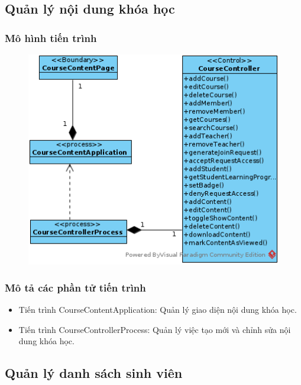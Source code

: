 \documentclass[./../main.tex]{subfiles}
\begin{document}
\subsection{Quản lý nội dung khóa học}

\subsubsection{Mô hình tiến trình}

\begin{figure}[H]
	\centering
	\includegraphics[width=\linewidth]{./images/pv_manage_contentcourse.png}
\end{figure}

\subsubsection{Mô tả các phần tử tiến trình}
\begin{itemize}
	\item Tiến trình CourseContentApplication: Quản lý giao diện nội dung khóa học.
	\item Tiến trình CourseControllerProcess: Quản lý việc tạo mới và chỉnh sửa nội dung khóa học.
\end{itemize}

\subsection{Quản lý danh sách sinh viên}
\end{document}
